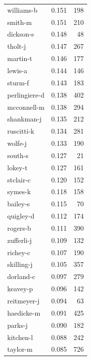 \documentclass{vldb}
\begin{document}
\begin{appendix}
\begin{supertabular}{ l r r }
williams-b     &                 0.151 &     198 \\
smith-m        &                 0.151 &     210 \\
dickson-s      &                 0.148 &      48 \\
tholt-j        &                 0.147 &     267 \\
martin-t       &                 0.146 &     177 \\
lewis-a        &                 0.144 &     146 \\
sturm-f        &                 0.143 &     183 \\
perlingiere-d  &                 0.138 &     402 \\
mcconnell-m    &                 0.138 &     294 \\
shankman-j     &                 0.135 &     212 \\
ruscitti-k     &                 0.134 &     281 \\
wolfe-j        &                 0.133 &     190 \\
south-s        &                 0.127 &      21 \\
lokey-t        &                 0.127 &     161 \\
stclair-c      &                 0.120 &     152 \\
symes-k        &                 0.118 &     158 \\
bailey-s       &                 0.115 &      70 \\
quigley-d      &                 0.112 &     174 \\
rogers-b       &                 0.111 &     390 \\
zufferli-j     &                 0.109 &     132 \\
richey-c       &                 0.107 &     190 \\
skilling-j     &                 0.105 &     357 \\
dorland-c      &                 0.097 &     279 \\
keavey-p       &                 0.096 &     142 \\
reitmeyer-j    &                 0.094 &      63 \\
haedicke-m     &                 0.091 &     425 \\
parks-j        &                 0.090 &     182 \\
kitchen-l      &                 0.088 &     242 \\
taylor-m       &                 0.085 &     726 \\

\end{supertabular}
\end{appendix}
\end{document}
